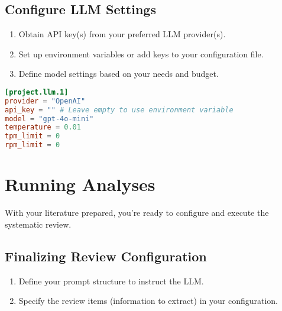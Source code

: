 \subsection{Configure LLM Settings}

\begin{enumerate}
    \item Obtain API key(s) from your preferred LLM provider(s).
    \item Set up environment variables or add keys to your configuration file.
    \item Define model settings based on your needs and budget.
\end{enumerate}

\begin{configbox}
\begin{lstlisting}[language=TOML]
[project.llm.1]
provider = "OpenAI"
api_key = "" # Leave empty to use environment variable
model = "gpt-4o-mini"
temperature = 0.01
tpm_limit = 0
rpm_limit = 0
\end{lstlisting}
\end{configbox}

\section{Running Analyses}

With your literature prepared, you're ready to configure and execute the systematic review.

\subsection{Finalizing Review Configuration}
\begin{enumerate}
    \item Define your prompt structure to instruct the LLM.
    \item Specify the review items (information to extract) in your configuration.
\end{enumerate}

